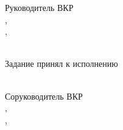 \begin{par}
	\begin{flushleft}
		\leftskip=0.4cm
		\begin{minipage}[t]{0.35\textwidth}
			Руководитель ВКР \\
			\sadegree, \sarank \\
			\sansutitle, \\
			\sainfotemplate \\[1mm]
			\datetemplate
		\end{minipage}
		\hspace{25mm}
		\begin{minipage}[t]{0.35\textwidth}
			Задание принял к исполнению \\
			\studentinfotemplate \\[1mm]
			\datetemplate
		\end{minipage}
		\begin{minipage}[t]{0.35\textwidth}
			\vspace{0.3cm}
			Соруководитель ВКР \\
			\csadegree, \csarank \\
			\csansutitle, \\
			\csainfotemplate \\[1mm]
			\datetemplate
		\end{minipage}
	\end{flushleft}

\end{par}
